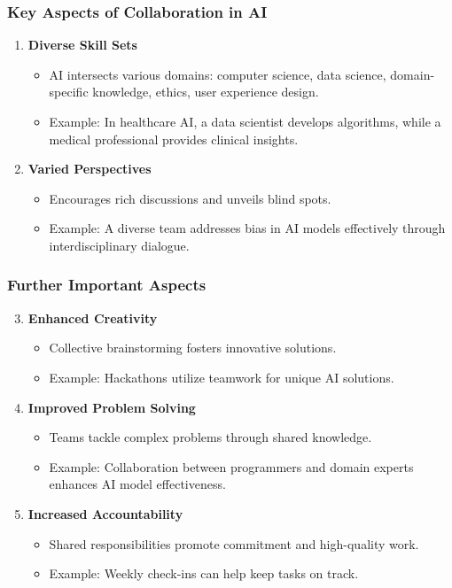 \documentclass[aspectratio=169]{beamer}
\begin{document}
\begin{frame}[fragile]
    \frametitle{Key Aspects of Collaboration in AI}
    \begin{enumerate}
        \item \textbf{Diverse Skill Sets}
            \begin{itemize}
                \item AI intersects various domains: computer science, data science, domain-specific knowledge, ethics, user experience design.
                \item Example: In healthcare AI, a data scientist develops algorithms, while a medical professional provides clinical insights.
            \end{itemize}
        \item \textbf{Varied Perspectives}
            \begin{itemize}
                \item Encourages rich discussions and unveils blind spots.
                \item Example: A diverse team addresses bias in AI models effectively through interdisciplinary dialogue.
            \end{itemize}
    \end{enumerate}
\end{frame}

\begin{frame}[fragile]
    \frametitle{Further Important Aspects}
    \begin{enumerate}
        \setcounter{enumi}{2}
        \item \textbf{Enhanced Creativity}
            \begin{itemize}
                \item Collective brainstorming fosters innovative solutions.
                \item Example: Hackathons utilize teamwork for unique AI solutions.
            \end{itemize}
        \item \textbf{Improved Problem Solving}
            \begin{itemize}
                \item Teams tackle complex problems through shared knowledge.
                \item Example: Collaboration between programmers and domain experts enhances AI model effectiveness.
            \end{itemize}
        \item \textbf{Increased Accountability}
            \begin{itemize}
                \item Shared responsibilities promote commitment and high-quality work.
                \item Example: Weekly check-ins can help keep tasks on track.
            \end{itemize}
    \end{enumerate}
\end{frame}
\end{document}
